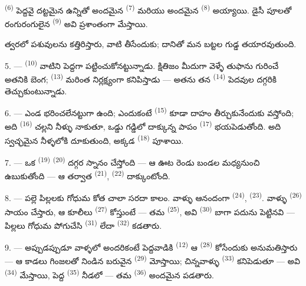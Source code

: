  \textsuperscript{(6)} పెద్దవై దట్టమైన ఉన్నితో అందమైన 
\textsuperscript{(7)} మరియు అందమైన  \textsuperscript{(8)} అయ్యాయి. డైసీ
పూలతో రంగురంగులైన  \textsuperscript{(9)}  అవి ప్రశాంతంగా
మేస్తాయి.

త్వరలో  పశువులను కత్తిరిస్తారు, వాటి  తీసేందుకు; దానితో మన బట్టల గుడ్డ
తయారవుతుంది.

\VUsaut{5.0mm}
\VUsaut{3.4mm}

5. ---  \textsuperscript{(10)} వాటిని పెద్దగా పట్టించుకోనట్టున్నాడు.
క్షితిజం మీదుగా వెళ్ళే తుఫాను గురించే అతనికి బెంగ; 
\textsuperscript{(13)} మరింత నిర్లక్ష్యంగా కనిపిస్తాడు — అతను తన 
\textsuperscript{(14)} పెదవుల దగ్గరికి తెచ్చుకుంటున్నాడు.

6. --- ఎండ భరించలేనట్టుగా ఉంది; ఎందుకంటే  \textsuperscript{(15)} కూడా దాహం
తీర్చుకునేందుకు వస్తోంది; అది  \textsuperscript{(16)} చల్లని నీళ్ళు నాకుతూ,
ఒడ్డు గడ్డిలో దాక్కున్న పాపం  \textsuperscript{(17)} భయపెడుతోంది. అది స్వచ్ఛమైన
నీళ్ళలోకి దూకుతుంది, అక్కడ  \textsuperscript{(18)} పూశాయి.

7. --- ఒక  \textsuperscript{(19)}  \textsuperscript{(20)}
దగ్గర స్నానం చేస్తోంది — ఆ ఊట రెండు బండల మధ్యనుంచి ఉబుకుతోంది — ఆ తర్వాత
 \textsuperscript{(21)}, 
\textsuperscript{(22)} దాక్కుంటోంది.

\VUsaut{5.0mm}
\VUsaut{3.4mm}

8. --- పల్లె పిల్లలకు గోధుమ కోత చాలా సరదా కాలం. వాళ్ళు ఆనందంగా 
\textsuperscript{(24)},  \textsuperscript{(23)}. వాళ్ళు
 \textsuperscript{(26)} సాయం చేస్తారు, ఆ కూలీలు 
\textsuperscript{(27)} కోస్తుంటే — తమ  \textsuperscript{(25)}, అవి
 \textsuperscript{(30)} బాగా పదును పెట్టినవి — పిల్లలు గోధుమ పోగుచేసి
 \textsuperscript{(31)} లేదా  \textsuperscript{(32)} కడతారు.

9. --- అప్పుడప్పుడూ వాళ్ళలో అందరికంటే పెద్దవాడికి  \textsuperscript{(12)} ఆ
 \textsuperscript{(28)} కోసేందుకు అనుమతిస్తారు — ఆ కాడలు గింజలతో నిండిన
బరువైన  \textsuperscript{(29)} మోస్తాయి; చిన్నవాళ్ళు 
\textsuperscript{(33)} కనిపెడుతూ — అవి  \textsuperscript{(34)} మేస్తాయి,
పెద్ద  \textsuperscript{(35)} నీడలో — తమ 
\textsuperscript{(36)} అందమైన  పడతారు.

